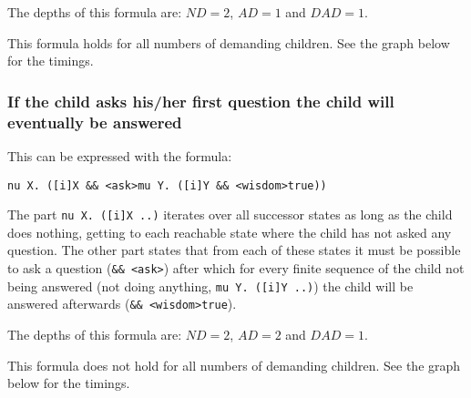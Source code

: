 \documentclass[10pt,a4paper]{article}
\begin{document}
The depths of this formula are: $ND = 2$, $AD = 1$ and $DAD = 1$.

This formula holds for all numbers of demanding children. See the graph below for the timings.


\subsubsection{If the child asks his/her first question the child will eventually be answered}
This can be expressed with the formula:

\begin{center}
	{\tt nu X. ([i]X \&\& <ask>mu Y. ([i]Y \&\& <wisdom>true))}
\end{center}	
	
The part {\tt nu X. ([i]X ..)} iterates over all successor states as long as the child does nothing, getting to each reachable state where the child has not asked any question. The other part states that from each of these states it must be possible to ask a question ({\tt \&\& <ask>}) after which for every finite sequence of the child not being answered (not doing anything, {\tt mu Y. ([i]Y ..)}) the child will be answered afterwards ({\tt \&\& <wisdom>true}).

The depths of this formula are: $ND = 2$, $AD = 2$ and $DAD = 1$.

This formula does not hold for all numbers of demanding children. See the graph below for the timings.

\end{document}
